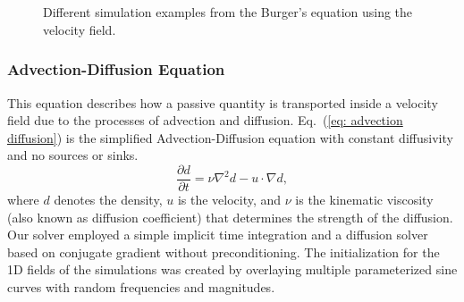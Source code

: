 \begin{figure}[ht]
    \centering
    ~\par\smallskip
    ~\par\smallskip
        
    \caption{Different simulation examples from the Burger's equation using the velocity field.}
    \label{fig: burgersEq example}
\end{figure}


\subsubsection*{Advection-Diffusion Equation} This equation describes how a passive quantity is transported inside a velocity field due to the processes of advection and diffusion.
Eq.~(\ref{eq: advection diffusion}) is the simplified Advection-Diffusion equation with constant diffusivity and no sources or sinks.
\begin{equation}
\frac{\partial d}{\partial t} = \nu \nabla^2 d - u \cdot \nabla d,
\label{eq: advection diffusion}
\end{equation}
where $d$ denotes the density, $u$ is the velocity, and $\nu$ is the kinematic viscosity (also known as diffusion coefficient) that determines the strength of the diffusion. 
Our solver employed a simple implicit time integration and a diffusion solver based on conjugate gradient without preconditioning. The initialization for the 1D fields of the simulations was created by overlaying multiple parameterized sine curves with random frequencies and magnitudes. 

